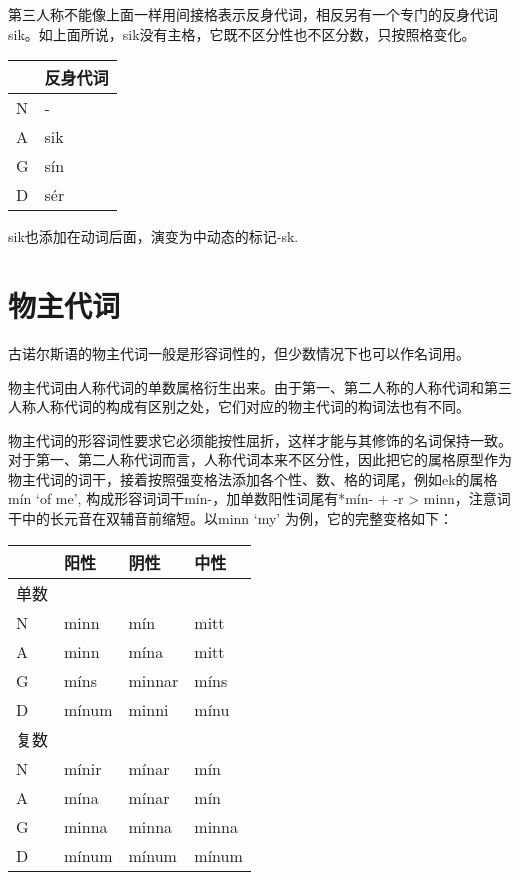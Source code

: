 第三人称不能像上面一样用间接格表示反身代词，相反另有一个专门的反身代词sik。如上面所说，sik没有主格，它既不区分性也不区分数，只按照格变化。

\begin{longtable}{ll}
  \toprule
    & 反身代词 \\
  \midrule
  \endhead
  \bottomrule
  \endfoot
  N & -    \\
  A & sik  \\
  G & sín  \\
  D & sér  \\
\end{longtable}

sik也添加在动词后面，演变为中动态的标记-sk.

\section{物主代词}\label{物主代词}

古诺尔斯语的物主代词一般是形容词性的，但少数情况下也可以作名词用。

物主代词由人称代词的单数属格衍生出来。由于第一、第二人称的人称代词和第三人称人称代词的构成有区别之处，它们对应的物主代词的构词法也有不同。

物主代词的形容词性要求它必须能按性屈折，这样才能与其修饰的名词保持一致。对于第一、第二人称代词而言，人称代词本来不区分性，因此把它的属格原型作为物主代词的词干，接着按照强变格法添加各个性、数、格的词尾，例如ek的属格
mín `of me‌', 构成形容词词干mín-，加单数阳性词尾有*mín- + -r
\textgreater{} minn，注意词干中的长元音在双辅音前缩短。以minn `my‌'
为例，它的完整变格如下：

\begin{longtable}{llll}
  \toprule
     & 阳性    & 阴性     & 中性    \\
  \midrule
  \endhead
  \bottomrule
  \endfoot
  单数 &       &        &       \\
  N  & minn  & mín    & mitt  \\
  A  & minn  & mína   & mitt  \\
  G  & míns  & minnar & míns  \\
  D  & mínum & minni  & mínu  \\
  复数 &       &        &       \\
  N  & mínir & mínar  & mín   \\
  A  & mína  & mínar  & mín   \\
  G  & minna & minna  & minna \\
  D  & mínum & mínum  & mínum \\
\end{longtable}

